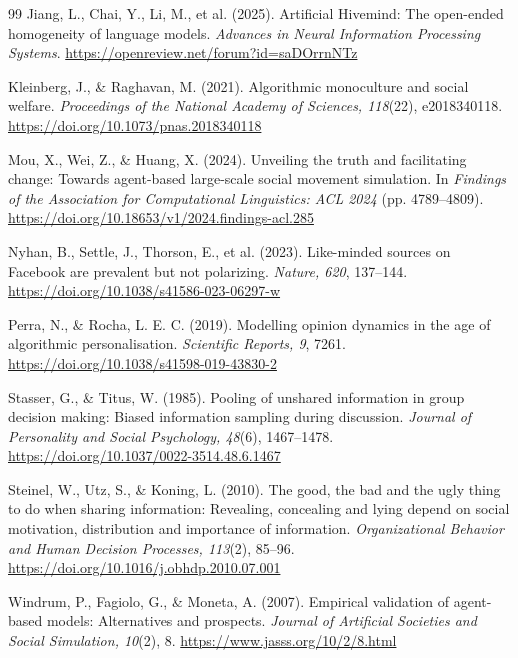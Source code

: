 \documentclass[11pt,a4paper]{article}
\begin{document}
\begin{thebibliography}{99}
Jiang, L., Chai, Y., Li, M., et al. (2025). Artificial Hivemind: The open-ended homogeneity of language models. \textit{Advances in Neural Information Processing Systems}. \url{https://openreview.net/forum?id=saDOrrnNTz}

Kleinberg, J., \& Raghavan, M. (2021). Algorithmic monoculture and social welfare. \textit{Proceedings of the National Academy of Sciences, 118}(22), e2018340118. \url{https://doi.org/10.1073/pnas.2018340118}

Mou, X., Wei, Z., \& Huang, X. (2024). Unveiling the truth and facilitating change: Towards agent-based large-scale social movement simulation. In \textit{Findings of the Association for Computational Linguistics: ACL 2024} (pp. 4789--4809). \url{https://doi.org/10.18653/v1/2024.findings-acl.285}

Nyhan, B., Settle, J., Thorson, E., et al. (2023). Like-minded sources on Facebook are prevalent but not polarizing. \textit{Nature, 620}, 137--144. \url{https://doi.org/10.1038/s41586-023-06297-w}

Perra, N., \& Rocha, L. E. C. (2019). Modelling opinion dynamics in the age of algorithmic personalisation. \textit{Scientific Reports, 9}, 7261. \url{https://doi.org/10.1038/s41598-019-43830-2}

Stasser, G., \& Titus, W. (1985). Pooling of unshared information in group decision making: Biased information sampling during discussion. \textit{Journal of Personality and Social Psychology, 48}(6), 1467--1478. \url{https://doi.org/10.1037/0022-3514.48.6.1467}

Steinel, W., Utz, S., \& Koning, L. (2010). The good, the bad and the ugly thing to do when sharing information: Revealing, concealing and lying depend on social motivation, distribution and importance of information. \textit{Organizational Behavior and Human Decision Processes, 113}(2), 85--96. \url{https://doi.org/10.1016/j.obhdp.2010.07.001}

Windrum, P., Fagiolo, G., \& Moneta, A. (2007). Empirical validation of agent-based models: Alternatives and prospects. \textit{Journal of Artificial Societies and Social Simulation, 10}(2), 8. \url{https://www.jasss.org/10/2/8.html}

\end{thebibliography}
\endgroup
\end{document}
